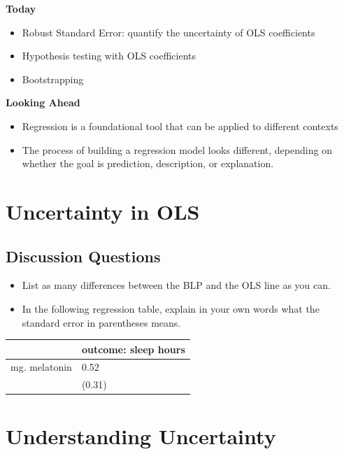 \documentclass[
  letterpaper,
  DIV=11,
  numbers=noendperiod]{scrreprt}
\providecommand{\tightlist}{%
  \setlength{\itemsep}{0pt}\setlength{\parskip}{0pt}}\usepackage{longtable,booktabs,array}
\begin{document}
\textbf{Today}

\begin{itemize}
\tightlist
\item
  Robust Standard Error: quantify the uncertainty of OLS coefficients
\item
  Hypothesis testing with OLS coefficients
\item
  Bootstrapping
\end{itemize}

\textbf{Looking Ahead}

\begin{itemize}
\tightlist
\item
  Regression is a foundational tool that can be applied to different
  contexts
\item
  The process of building a regression model looks different, depending
  on whether the goal is prediction, description, or explanation.
\end{itemize}

\section{Uncertainty in OLS}\label{uncertainty-in-ols}

\subsection{Discussion Questions}\label{discussion-questions-1}

\begin{itemize}
\tightlist
\item
  List as many differences between the BLP and the OLS line as you can.
\item
  In the following regression table, explain in your own words what the
  standard error in parentheses means.
\end{itemize}

\begin{longtable}[]{@{}ll@{}}
\toprule\noalign{}
& outcome: sleep hours \\
\midrule\noalign{}
\endhead
\bottomrule\noalign{}
\endlastfoot
mg. melatonin & 0.52 \\
& (0.31) \\
\end{longtable}

\section{Understanding Uncertainty}\label{understanding-uncertainty}
\end{document}
